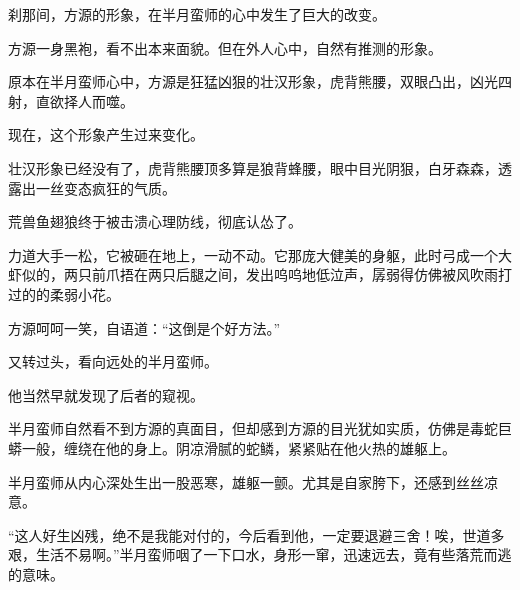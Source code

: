 \begin{this_body}
刹那间，方源的形象，在半月蛮师的心中发生了巨大的改变。

方源一身黑袍，看不出本来面貌。但在外人心中，自然有推测的形象。

原本在半月蛮师心中，方源是狂猛凶狠的壮汉形象，虎背熊腰，双眼凸出，凶光四射，直欲择人而噬。

现在，这个形象产生过来变化。

壮汉形象已经没有了，虎背熊腰顶多算是狼背蜂腰，眼中目光阴狠，白牙森森，透露出一丝变态疯狂的气质。

荒兽鱼翅狼终于被击溃心理防线，彻底认怂了。

力道大手一松，它被砸在地上，一动不动。它那庞大健美的身躯，此时弓成一个大虾似的，两只前爪捂在两只后腿之间，发出呜呜地低泣声，孱弱得仿佛被风吹雨打过的的柔弱小花。

方源呵呵一笑，自语道：“这倒是个好方法。”

又转过头，看向远处的半月蛮师。

他当然早就发现了后者的窥视。

半月蛮师自然看不到方源的真面目，但却感到方源的目光犹如实质，仿佛是毒蛇巨蟒一般，缠绕在他的身上。阴凉滑腻的蛇鳞，紧紧贴在他火热的雄躯上。

半月蛮师从内心深处生出一股恶寒，雄躯一颤。尤其是自家胯下，还感到丝丝凉意。

“这人好生凶残，绝不是我能对付的，今后看到他，一定要退避三舍！唉，世道多艰，生活不易啊。”半月蛮师咽了一下口水，身形一窜，迅速远去，竟有些落荒而逃的意味。

\end{this_body}

